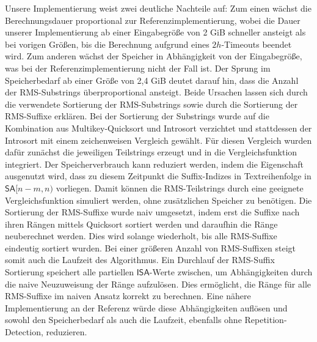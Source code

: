 Unsere Implementierung weist zwei deutliche Nachteile auf: Zum einen wächst die Berechnungsdauer proportional zur Referenzimplementierung, wobei die Dauer unserer Implementierung ab einer Eingabegröße von 2 GiB schneller ansteigt als bei vorigen Größen, bis die Berechnung aufgrund eines $2h$-Timeouts beendet wird. Zum anderen wächst der Speicher in Abhängigkeit von der Eingabegröße, was bei der Referenzimplementierung nicht der Fall ist. Der Sprung im Speicherbedarf ab einer Größe von 2,4 GiB deutet darauf hin, dass die Anzahl der RMS-Substrings überproportional ansteigt. Beide Ursachen lassen sich durch die verwendete Sortierung der RMS-Substrings sowie durch die Sortierung der RMS-Suffixe erklären. Bei der Sortierung der Substrings wurde auf die Kombination aus Multikey-Quicksort und Introsort verzichtet und stattdessen der Introsort mit einem zeichenweisen Vergleich gewählt. Für diesen Vergleich wurden dafür zunächst die jeweiligen Teilstrings erzeugt und in die Vergleichsfunktion integriert. Der Speicherverbrauch kann reduziert werden, indem die Eigenschaft ausgenutzt wird, dass zu diesem Zeitpunkt die Suffix-Indizes in Textreihenfolge in $\mathsf{SA}[n-m, n)$ vorliegen. Damit können die RMS-Teilstrings durch eine geeignete Vergleichsfunktion simuliert werden, ohne zusätzlichen Speicher zu benötigen.
Die Sortierung der RMS-Suffixe wurde naiv umgesetzt, indem erst die Suffixe nach ihren Rängen mittels Quicksort sortiert werden und daraufhin die Ränge neuberechnet werden. Dies wird solange wiederholt, bis alle RMS-Suffixe eindeutig sortiert wurden. Bei einer größeren Anzahl von RMS-Suffixen steigt somit auch die Laufzeit des Algorithmus. Ein Durchlauf der RMS-Suffix Sortierung speichert alle partiellen $\mathsf{ISA}$-Werte zwischen, um Abhängigkeiten durch die naive Neuzuweisung der Ränge aufzulösen. Dies ermöglicht, die Ränge für alle RMS-Suffixe im naiven Ansatz korrekt zu berechnen. Eine nähere Implementierung an der Referenz würde diese Abhängigkeiten auflösen und sowohl den Speicherbedarf als auch die Laufzeit, ebenfalls ohne Repetition-Detection, reduzieren.